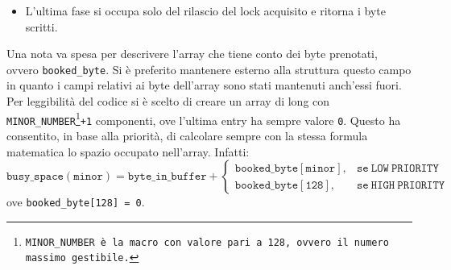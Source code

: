 \documentclass[oneside]{article}
\begin{document}
\begin{itemize}
\begin{itemize}
\begin{enumerate}
\item Viene incrementato il numero di byte nel buffer e viene invocata la \texttt{wake\_up\_interruptible}.
\end{enumerate}
\item Nel caso di \texttt{LOW PRIORITY}:
\begin{enumerate}
\item Si chiama la \texttt{try\_module\_get}.
\item Si collega solamente\footnote{Questo è un punto in favore in termini di performance perché all'interno della sezione critica si ha bisogno solamente di collegare il contenuto da scrivere alla struttura del deferred work.} il contenuto da scrivere al deferred work.
\item Si chiama \texttt{\_\_INIT\_WORK}.
\item Si incrementano i byte prenotati.
\item Si accoda il lavoro nella workqueue.
\end{enumerate}
\end{itemize}
\item L'ultima fase si occupa solo del rilascio del lock acquisito e ritorna i byte scritti.
\end{itemize}

Una nota va spesa per descrivere l'array che tiene conto dei byte prenotati, ovvero \texttt{booked\_byte}. Si è preferito mantenere esterno alla struttura questo campo in quanto i campi relativi ai byte dell'array sono stati mantenuti anch'essi fuori. Per leggibilità del codice si è scelto di creare un array di long con \texttt{MINOR\_NUMBER\footnote{\texttt{MINOR\_NUMBER} è la macro con valore pari a \texttt{128}, ovvero il numero massimo gestibile.}+1} componenti, ove l'ultima entry ha sempre valore \texttt{0}. Questo ha consentito, in base alla priorità, di calcolare sempre con la stessa formula matematica lo spazio occupato nell'array. Infatti:
\begin{equation*}
\mathtt{busy\_space(minor) = byte\_in\_buffer +}
\begin{cases}
	\mathtt{booked\_byte[minor]},& \mathtt{se\ LOW\ PRIORITY} \\
	\mathtt{booked\_byte[128]},& \mathtt{se\ HIGH\ PRIORITY}
\end{cases}
\end{equation*}
ove \texttt{booked\_byte[128] = 0}.
\end{document}
